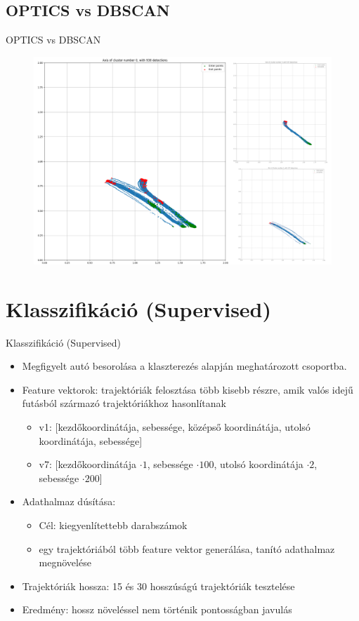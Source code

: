\documentclass{beamer}
\begin{document}
\subsection{OPTICS vs DBSCAN}
\begin{frame}{OPTICS vs DBSCAN}
    \centering
    \begin{figure}
        \includegraphics[scale=0.2]{../bad_clustering/example_dbscan_vs_optics_merged_cluster.png}
    \end{figure}
\end{frame}

\section{Klasszifikáció (Supervised)}
\begin{frame}{Klasszifikáció (Supervised)}
    \begin{itemize}
        \item Megfigyelt autó besorolása a klaszterezés alapján meghatározott csoportba.
        \item Feature vektorok: trajektóriák felosztása több kisebb részre, amik valós idejű futásból származó trajektóriákhoz hasonlítanak
        \begin{itemize}
            \item v1: [kezdőkoordinátája, sebessége, középső koordinátája, utolsó koordinátája, sebessége]
            \item v7: [kezdőkoordinátája $\cdot 1$, sebessége $\cdot 100$, utolsó koordinátája $\cdot 2$, sebessége $\cdot 200$]
        \end{itemize}
        \item Adathalmaz dúsítása:
        \begin{itemize}
            \item Cél: kiegyenlítettebb darabszámok
            \item egy trajektóriából több feature vektor generálása, tanító adathalmaz megnövelése
        \end{itemize}
        \item Trajektóriák hossza: 15 és 30 hosszúságú trajektóriák tesztelése
        \item Eredmény: hossz növeléssel nem történik pontosságban javulás
    \end{itemize}
\end{frame}
\end{document}
